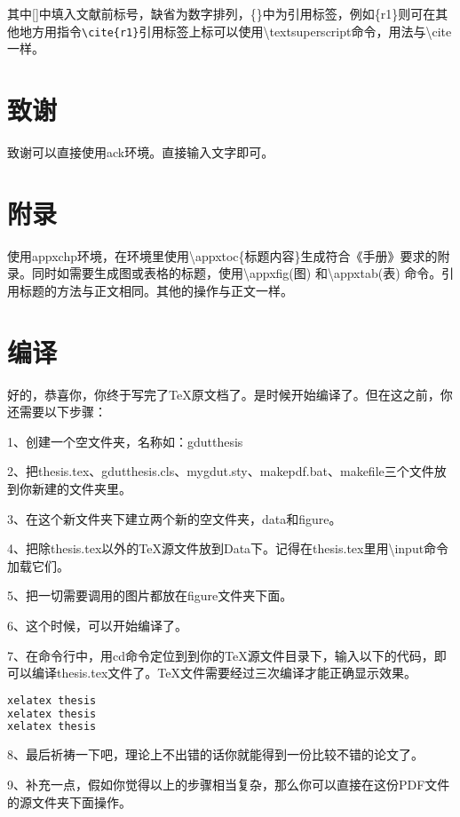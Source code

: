 其中[]中填入文献前标号，缺省为数字排列，\{\}中为引用标签，例如\{r1\}则可在其他地方用指令\verb|\cite{r1}|引用标签上标可以使用\textbackslash textsuperscript命令，用法与\textbackslash cite一样。

\section{致谢}
致谢可以直接使用ack环境。直接输入文字即可。

\section{附录}
使用appxchp环境，在环境里使用\textbackslash appxtoc\{标题内容\}生成符合《手册》要求的附录。同时如需要生成图或表格的标题，使用\textbackslash appxfig(图) 和\textbackslash appxtab(表) 命令。引用标题的方法与正文相同。其他的操作与正文一样。

\section{编译}
\label{sec:compile}
好的，恭喜你，你终于写完了\TeX{}原文档了。是时候开始编译了。但在这之前，你还需要以下步骤：

1、创建一个空文件夹，名称如：gdutthesis

2、把thesis.tex、gdutthesis.cls、mygdut.sty、makepdf.bat、makefile三个文件放到你新建的文件夹里。

3、在这个新文件夹下建立两个新的空文件夹，data和figure。

4、把除thesis.tex以外的\TeX{}源文件放到Data下。记得在thesis.tex里用\textbackslash input命令加载它们。

5、把一切需要调用的图片都放在figure文件夹下面。

6、这个时候，可以开始编译了。

7、在命令行中，用cd命令定位到到你的\TeX{}源文件目录下，输入以下的代码，即可以编译thesis.tex文件了。\TeX{}文件需要经过三次编译才能正确显示效果。 

\begin{lstlisting}[language=TeX]
xelatex thesis
xelatex thesis
xelatex thesis
\end{lstlisting}

8、最后祈祷一下吧，理论上不出错的话你就能得到一份比较不错的论文了。

9、补充一点，假如你觉得以上的步骤相当复杂，那么你可以直接在这份PDF文件的源文件夹下面操作。
